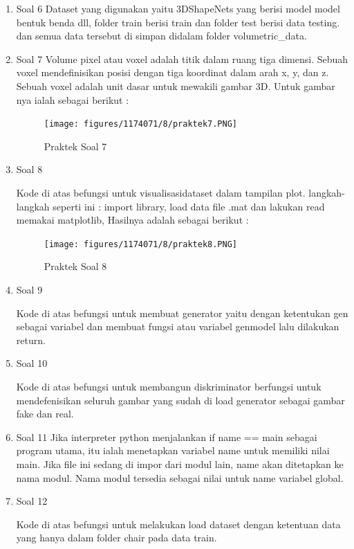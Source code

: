 \begin{enumerate}
	\item Soal 6
	\hfill\break
	Dataset yang digunakan yaitu 3DShapeNets yang berisi model model bentuk benda dll, folder train berisi train dan folder test berisi data testing. dan semua data tersebut di simpan didalam folder volumetric\_data.

	\item Soal 7
	\hfill\break
	Volume pixel atau voxel adalah titik dalam ruang tiga dimensi. Sebuah voxel mendefinisikan posisi dengan tiga koordinat dalam arah x, y, dan z. Sebuah voxel adalah unit dasar untuk mewakili gambar 3D. Untuk gambar nya ialah sebagai berikut :
	\begin{figure}[H]
	\centering
		\texttt{[image: figures/1174071/8/praktek7.PNG]}
		\caption{Praktek Soal 7}
	\end{figure}

	\item Soal 8
	\hfill\break
	
	Kode di atas befungsi untuk visualisasidataset dalam tampilan plot. langkah-langkah seperti ini :
	import library, load data file .mat dan lakukan read memakai matplotlib, Hasilnya adalah sebagai berikut :
	\begin{figure}[H]
	\centering
		\texttt{[image: figures/1174071/8/praktek8.PNG]}
		\caption{Praktek Soal 8}
	\end{figure}

	\item Soal 9
	\hfill\break
	
	Kode di atas befungsi untuk membuat generator yaitu dengan ketentukan gen sebagai variabel dan membuat fungsi atau variabel genmodel lalu dilakukan return. 
	
	\item Soal 10
	\hfill\break
	
	Kode di atas befungsi untuk membangun diskriminator berfungsi untuk mendefenisikan seluruh gambar yang sudah di load generator sebagai gambar fake dan real.

	\item Soal 11
	\hfill\break
	Jika interpreter python menjalankan if name == main sebagai program utama, itu ialah menetapkan variabel name untuk memiliki nilai main. Jika file ini sedang di impor dari modul lain, name akan ditetapkan ke nama modul. Nama modul tersedia sebagai nilai untuk name variabel global.

	\item Soal 12
	\hfill\break
	
	Kode di atas befungsi untuk melakukan load dataset dengan ketentuan data yang hanya dalam folder chair pada data train.


\end{enumerate}
